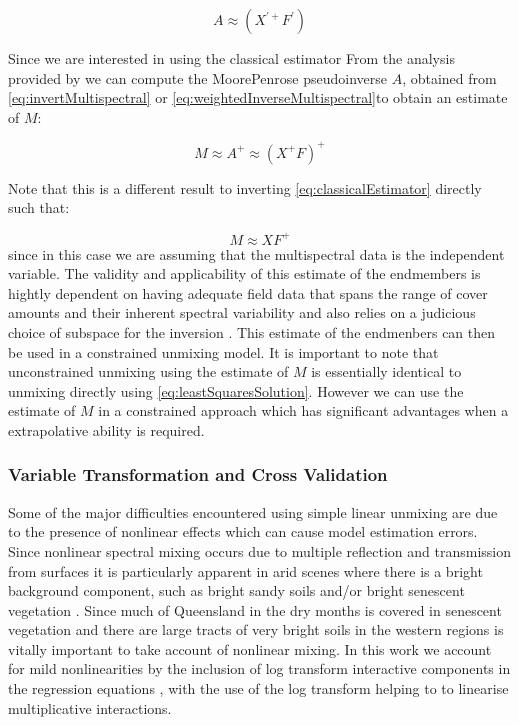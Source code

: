 \documentclass[remotesensing,article,accept,moreauthors,pdftex,12pt,a4paper]{mdpi}
\begin{document}
\begin{equation} A\approx(X^{'+}F^{'})\label{eq:weightedInverseMultispectral}\end{equation} 

Since we are interested in using the classical estimator From the analysis provided by \citep{Settle1998} we can compute the Moore\textendash{}Penrose pseudoinverse $A$, obtained from \ref{eq:invertMultispectral} or \ref{eq:weightedInverseMultispectral}to obtain an estimate of $M$:

\begin{equation} M\approx A^{+}\approx(X^{+}F)^{+}\label{eq:recoverEndmembers}\end{equation} 

Note that this is a different result to inverting \ref{eq:classicalEstimator} directly such that:

\begin{equation} M\approx XF^{+}\label{eq:invertClassicalEstimator}\end{equation} since in this case we are assuming that the multispectral data is the independent variable. The validity and applicability of this estimate of the endmembers is hightly dependent on having adequate field data that spans the range of cover amounts and their inherent spectral variability and also relies on a judicious choice of subspace for the inversion \citep{Elden2004}. This estimate of the endmenbers can then be used in a constrained unmixing model. It is important to note that unconstrained unmixing using the estimate of $M$ is essentially identical to unmixing directly using \ref{eq:leastSquaresSolution}. However we can use the estimate of $M$ in a constrained approach which has significant advantages when a extrapolative ability is required. 

\subsubsection{Variable Transformation and Cross Validation}

Some of the major difficulties encountered using simple linear unmixing are due to the presence of nonlinear effects which can cause model estimation errors. Since nonlinear spectral mixing occurs due to multiple reflection and transmission from surfaces \citep{Borel1994} it is particularly apparent in arid scenes where there is a bright background component, such as bright sandy soils and/or bright senescent vegetation \citep{Okin2001,Ray1996}. Since much of Queensland in the dry months is covered in senescent vegetation and there are large tracts of very bright soils in the western regions is vitally important to take account of nonlinear mixing. In this work we account for mild nonlinearities by the inclusion of log transform interactive components in the regression equations \citep{Lawrence1998}, with the use of the log transform helping to to linearise multiplicative interactions.
\end{document}
